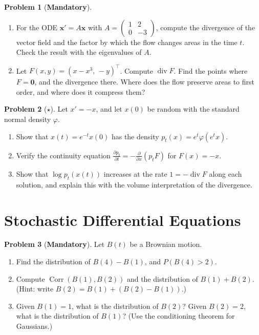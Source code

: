 \documentclass[11pt]{article}
\theoremstyle{definition}
\newtheorem{problem}{Problem}[section]
\newcommand{\mandatory}{\textcolor{red!70!black}{\textbf{Mandatory}}}
\DeclareMathOperator{\Corr}{Corr}
\DeclareMathOperator{\Div}{div}
\begin{document}
\begin{problem}[\mandatory]\label{pr:volume-flow}
    \begin{enumerate}[label=(\alph*)]
        \item For the ODE $\mathbf{x}' = A\mathbf{x}$ with $A = \begin{pmatrix} 1 & 2 \\ 0 & -3 \end{pmatrix}$, compute the divergence of the vector field and the factor by which the flow changes areas in the time $t$. Check the result with the eigenvalues of $A$.
        \item Let $F(x, y) = (x - x^3, \, -y)^\top$. Compute $\Div F$. Find the points where $F = \mathbf{0}$, and the divergence there. Where does the flow preserve areas to first order, and where does it compress them?
    \end{enumerate}
\end{problem}

\begin{problem}[$\star$]\label{pr:continuity-1d}
    Let $x' = -x$, and let $x(0)$ be random with the standard normal density $\varphi$.
    \begin{enumerate}[label=(\alph*)]
        \item Show that $x(t) = e^{-t}x(0)$ has the density $p_t(x) = e^t\varphi(e^tx)$.
        \item Verify the continuity equation $\frac{\partial p_t}{\partial t} = -\frac{\partial}{\partial x}(p_tF)$ for $F(x) = -x$.
        \item Show that $\log p_t(x(t))$ increases at the rate $1 = -\Div F$ along each solution, and explain this with the volume interpretation of the divergence.
    \end{enumerate}
\end{problem}

\section{Stochastic Differential Equations}

\begin{problem}[\mandatory]\label{pr:brownian}
    Let $B(t)$ be a Brownian motion.
    \begin{enumerate}[label=(\alph*)]
        \item Find the distribution of $B(4) - B(1)$, and $P(B(4) > 2)$.
        \item Compute $\Corr(B(1), B(2))$ and the distribution of $B(1) + B(2)$. (Hint: write $B(2) = B(1) + (B(2) - B(1))$.)
        \item Given $B(1) = 1$, what is the distribution of $B(2)$? Given $B(2) = 2$, what is the distribution of $B(1)$? (Use the conditioning theorem for Gaussians.)
    \end{enumerate}
\end{problem}
\end{document}

